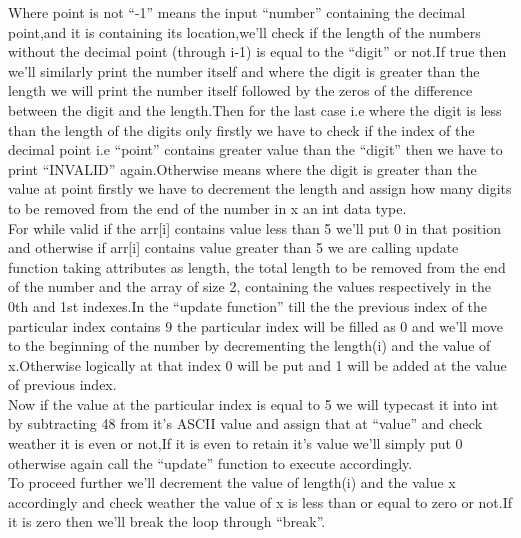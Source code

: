 \documentclass[conference]{IEEEtran}
\begin{document}
Where point is not “-1” means the input “number” containing the decimal point,and it is containing its location,we’ll check if the length of the numbers without the decimal point (through i-1) is equal to the “digit” or not.If true then we’ll similarly print the number itself and where the digit is greater than the length we will print the number itself followed by the zeros of the difference between the digit and the length.Then for the last case i.e where the digit is less than the length of the digits only firstly we have to check if the index of the decimal point i.e “point” contains greater value than the “digit” then we have to print “INVALID” again.Otherwise means where the digit is greater than the value at point  firstly we have to decrement the length and assign how many digits to be removed from the end of the number in x an int data type.\\

For while valid if the arr[i] contains value less than 5 we’ll put 0 in that position and otherwise if arr[i] contains value greater than 5 we are calling update function taking attributes as length, the total length to be removed from the end of the number and the array of size 2, containing the values respectively in the 0th and 1st indexes.In the “update function” till the the previous index of the particular index contains 9 the particular index will be filled as 0 and we’ll move to the beginning of the number by decrementing the length(i) and the value of x.Otherwise logically at that index 0 will be put and 1 will be added at the value of previous index.\\

Now if the value at the particular index is equal to 5 we will typecast it into int by subtracting  48 from it’s ASCII value and assign that at “value” and check weather it is even or not,If it is even to retain it’s value we’ll simply put 0 otherwise again call the “update” function to execute accordingly.\\

To proceed further we’ll decrement the value of length(i) and the value x accordingly and check weather the value of x is less than or equal to zero or not.If it is zero then we’ll break the loop through “break”.\\
\end{document}
